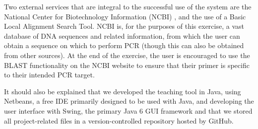 
Two external services that are integral to the successful use of the system
are the National Center for Biotechnology Information (NCBI) \cite{ncbi},
and the use of a Basic Local Alignment Search Tool. NCBI is, for the purposes
of this exercise, a vast database of DNA sequences and related information,
from which the user can obtain a sequence on which to perform PCR (though this
can also be obtained from other sources). At the end of the exercise, the
user is encouraged to use the BLAST functionality on the NCBI website to ensure
that their primer is specific to their intended PCR target.

It should also be explained that we developed the teaching tool
in Java, using Netbeans, a free IDE primarily designed to be used with
Java, and developing the user interface with Swing, the primary Java 6
GUI framework and that we stored all project-related files in a
version-controlled repository hosted by GitHub.

